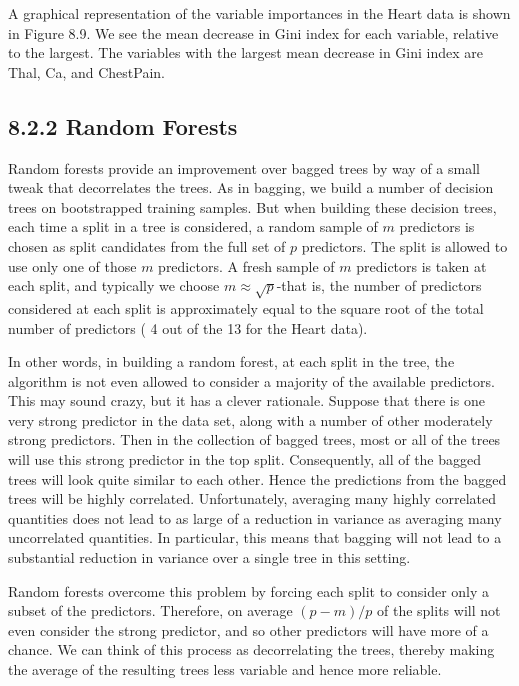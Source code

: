 \documentclass[10pt]{article}
\begin{document}
A graphical representation of the variable importances in the Heart data is shown in Figure 8.9. We see the mean decrease in Gini index for each variable, relative to the largest. The variables with the largest mean decrease in Gini index are Thal, Ca, and ChestPain.

\subsection*{8.2.2 Random Forests}
Random forests provide an improvement over bagged trees by way of a small tweak that decorrelates the trees. As in bagging, we build a number of decision trees on bootstrapped training samples. But when building these decision trees, each time a split in a tree is considered, a random sample of $m$ predictors is chosen as split candidates from the full set of $p$ predictors. The split is allowed to use only one of those $m$ predictors. A fresh sample of $m$ predictors is taken at each split, and typically we choose $m \approx \sqrt{p}$-that is, the number of predictors considered at each split is approximately equal to the square root of the total number of predictors ( 4 out of the 13 for the Heart data).

In other words, in building a random forest, at each split in the tree, the algorithm is not even allowed to consider a majority of the available predictors. This may sound crazy, but it has a clever rationale. Suppose that there is one very strong predictor in the data set, along with a number of other moderately strong predictors. Then in the collection of bagged trees, most or all of the trees will use this strong predictor in the top split. Consequently, all of the bagged trees will look quite similar to each other. Hence the predictions from the bagged trees will be highly correlated. Unfortunately, averaging many highly correlated quantities does not lead to as large of a reduction in variance as averaging many uncorrelated quantities. In particular, this means that bagging will not lead to a substantial reduction in variance over a single tree in this setting.

Random forests overcome this problem by forcing each split to consider only a subset of the predictors. Therefore, on average $(p-m) / p$ of the splits will not even consider the strong predictor, and so other predictors will have more of a chance. We can think of this process as decorrelating the trees, thereby making the average of the resulting trees less variable and hence more reliable.
\end{document}
